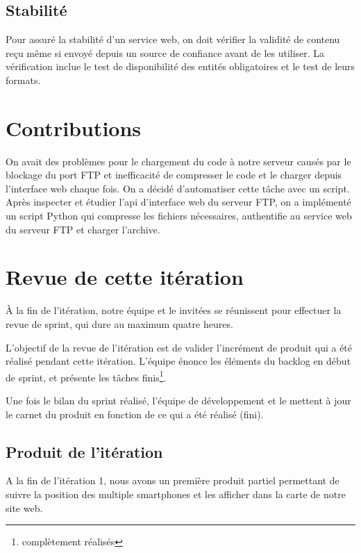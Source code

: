 \subsection{Stabilité}

Pour assuré la stabilité d'un service web, on doit vérifier la validité de
contenu reçu même si envoyé depuis un source de confiance avant de les
utiliser. La vérification inclue le test de disponibilité des entités
obligatoires et le test de leurs formats.


\section{Contributions}

On avait des problèmes pour le chargement du code à notre serveur causés par le
blockage du port FTP et inefficacité de compresser le code et le charger depuis
l'interface web chaque fois. On a décidé d'automatiser cette tâche avec un
script.  Après inspecter et étudier l'api d'interface web du serveur FTP, on a
implémenté un script Python qui compresse les fichiers nécessaires, authentifie
au service web du serveur FTP et charger l'archive.

\section{Revue de cette itération}

À la fin de l'itération, notre équipe et le  invitées
se réunissent pour effectuer la revue de sprint, qui dure au maximum quatre
heures.

L'objectif de la revue de l'itération est de valider l'incrément de produit qui
a été réalisé pendant cette itération. L'équipe énonce les éléments du backlog
en début de sprint, et présente les tâches finis\footnote{complètement
réalisés}.

Une fois le bilan du sprint réalisé, l'équipe de développement et le
 mettent à jour le carnet du produit en fonction de ce
qui a été réalisé (fini).

\subsection{Produit de l'itération}

A la fin de l'itération 1, nous avons un première produit partiel permettant de
suivre la position des multiple smartphones et les afficher dans la carte de
notre site web.

